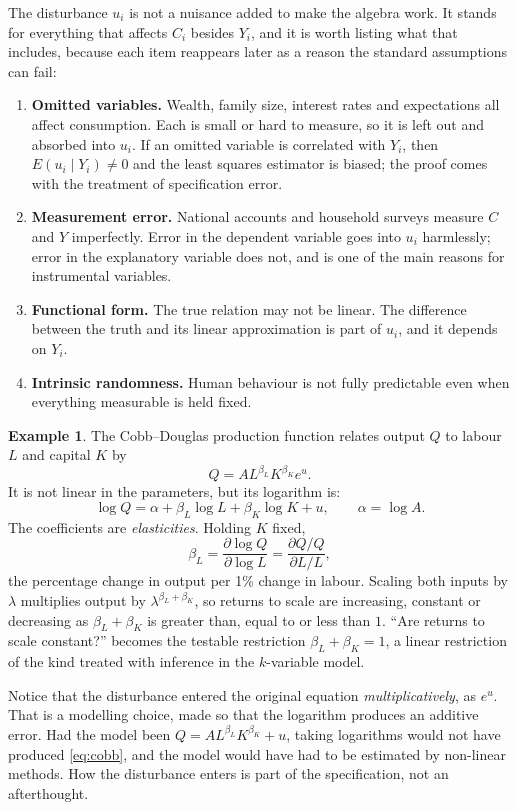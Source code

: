 \documentclass[11pt,a4paper]{article}
\numberwithin{equation}{section}
\theoremstyle{definition}
\newtheorem{exa}[thm]{Example}
\begin{document}
The disturbance $u_i$ is not a nuisance added to make the algebra work. It stands for everything that affects $C_i$ besides $Y_i$, and it is
worth listing what that includes, because each item reappears later as a reason the standard assumptions can fail:
\begin{enumerate}[label=(\alph*)]
\item \textbf{Omitted variables.} Wealth, family size, interest rates and expectations all affect consumption. Each is small or hard to
measure, so it is left out and absorbed into $u_i$. If an omitted variable is correlated with $Y_i$, then $E(u_i \mid Y_i) \neq 0$ and the
least squares estimator is biased; the proof comes with the treatment of specification error.
\item \textbf{Measurement error.} National accounts and household surveys measure $C$ and $Y$ imperfectly. Error in the dependent variable
goes into $u_i$ harmlessly; error in the explanatory variable does not, and is one of the main reasons for instrumental variables.
\item \textbf{Functional form.} The true relation may not be linear. The difference between the truth and its linear approximation is part
of $u_i$, and it depends on $Y_i$.
\item \textbf{Intrinsic randomness.} Human behaviour is not fully predictable even when everything measurable is held fixed.
\end{enumerate}

\begin{exa}
\label{ex:cobb}
The Cobb--Douglas production function relates output $Q$ to labour $L$ and capital $K$ by
\[
Q = A L^{\beta_L} K^{\beta_K} e^{u} .
\]
It is not linear in the parameters, but its logarithm is:
\begin{equation}
\label{eq:cobb}
\log Q = \alpha + \beta_L \log L + \beta_K \log K + u , \qquad \alpha = \log A .
\end{equation}
The coefficients are \emph{elasticities}. Holding $K$ fixed,
\[
\beta_L = \frac{\partial \log Q}{\partial \log L} = \frac{\partial Q / Q}{\partial L / L},
\]
the percentage change in output per 1\% change in labour. Scaling both inputs by $\lambda$ multiplies output by
$\lambda^{\beta_L + \beta_K}$, so returns to scale are increasing, constant or decreasing as $\beta_L + \beta_K$ is greater than, equal to or less
than $1$. ``Are returns to scale constant?'' becomes the testable restriction $\beta_L + \beta_K = 1$, a linear restriction of the kind
treated with inference in the $k$-variable model.

Notice that the disturbance entered the original equation \emph{multiplicatively}, as $e^{u}$. That is a modelling choice, made so that the
logarithm produces an additive error. Had the model been $Q = A L^{\beta_L} K^{\beta_K} + u$, taking logarithms would not have produced
\eqref{eq:cobb}, and the model would have had to be estimated by non-linear methods. How the disturbance enters is part of the specification,
not an afterthought.
\end{exa}
\end{document}
